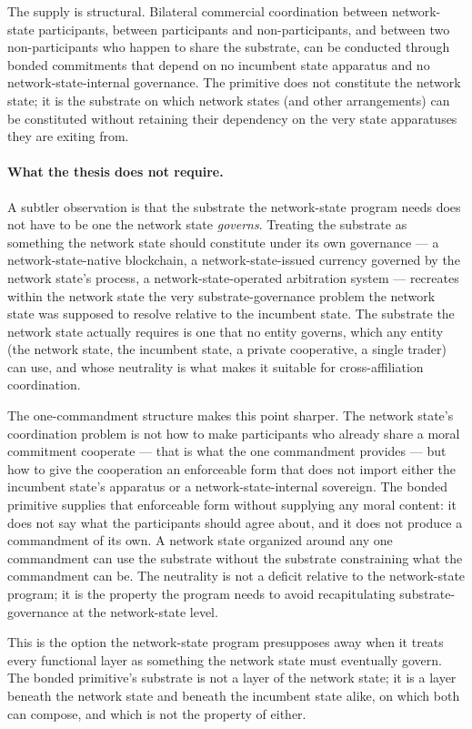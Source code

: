 \documentclass[11pt,a4paper]{article}
\theoremstyle{remark}
\begin{document}
The supply is structural. Bilateral commercial coordination
between network-state participants, between participants and
non-participants, and between two non-participants who happen to
share the substrate, can be conducted through bonded commitments
that depend on no incumbent state apparatus and no
network-state-internal governance. The primitive does not
constitute the network state; it is the substrate on which
network states (and other arrangements) can be constituted
without retaining their dependency on the very state apparatuses
they are exiting from.

\paragraph{What the thesis does not require.}
A subtler observation is that the substrate the network-state
program needs does not have to be one the network state
\emph{governs}. Treating the substrate as something the network
state should constitute under its own governance --- a
network-state-native blockchain, a network-state-issued currency
governed by the network state's process, a network-state-operated
arbitration system --- recreates within the network state the
very substrate-governance problem the network state was supposed
to resolve relative to the incumbent state. The substrate the
network state actually requires is one that no entity governs,
which any entity (the network state, the incumbent state, a
private cooperative, a single trader) can use, and whose
neutrality is what makes it suitable for cross-affiliation
coordination.

The one-commandment structure makes this point sharper. The
network state's coordination problem is not how to make
participants who already share a moral commitment cooperate ---
that is what the one commandment provides --- but how to give
the cooperation an enforceable form that does not import either
the incumbent state's apparatus or a network-state-internal
sovereign. The bonded primitive supplies that enforceable form
without supplying any moral content: it does not say what the
participants should agree about, and it does not produce a
commandment of its own. A network state organized around any
one commandment can use the substrate without the substrate
constraining what the commandment can be. The neutrality is
not a deficit relative to the network-state program; it is the
property the program needs to avoid recapitulating
substrate-governance at the network-state level.

This is the option the network-state program presupposes away
when it treats every functional layer as something the network
state must eventually govern. The bonded primitive's substrate
is not a layer of the network state; it is a layer beneath the
network state and beneath the incumbent state alike, on which
both can compose, and which is not the property of either.
\end{document}
